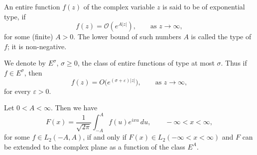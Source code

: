 An entire function $f(z)$ of the complex variable $z$ is said to be of exponential type, if
\begin{equation}\tag{7.1}\label{eq:II-7.1}
f(z)=\mathcal O(e^{A|z|}),\qquad\text{as }z\to\infty,
\end{equation}
for some (finite) $A>0$. The lower bound of such numbers $A$ is called the type of $f$; it is non-negative.

We denote by $E^{\sigma}$, $\sigma\ge 0$, the class of entire functions of type at most $\sigma$. Thus if $f\in E^{\sigma}$, then
\begin{equation}\tag{7.2}\label{eq:II-7.2}
f(z)=O\bigl(e^{(\sigma+\varepsilon)|z|}\bigr),\qquad\text{as }z\to\infty,
\end{equation}
for every $\varepsilon>0$.

\begin{theorem}\label{thm:II-10}
Let $0<A<\infty$. Then we have
\begin{equation}\tag{7.3}\label{eq:II-7.3}
F(x)=\frac{1}{\sqrt{2\pi}}\int_{-A}^{A}f(u)e^{ixu}\,du,\qquad-\infty<x<\infty,
\end{equation}
for some $f\in L_{2}(-A,A)$, if and only if $F(x)\in L_{2}(-\infty<x<\infty)$ and $F$ can be extended to the complex plane as a function of the class $E^{A}$.
\end{theorem}
